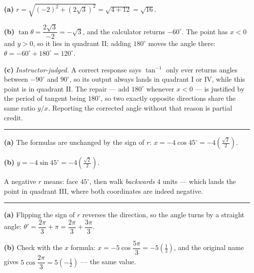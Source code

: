 \documentclass[12pt]{article}
\begin{document}

\textbf{(a)} $r = \sqrt{(-2)^2 + (2\sqrt{3})^2} = \sqrt{4 + 12} = \sqrt{16}$. 

\textbf{(b)} $\tan\theta = \dfrac{2\sqrt{3}}{-2} = -\sqrt{3}$, and the calculator returns $-60^\circ$. The point has $x < 0$ and $y > 0$, so it lies in quadrant II; adding $180^\circ$ moves the angle there:
$\theta = -60^\circ + 180^\circ = 120^\circ$. 

\textbf{(c)} \emph{Instructor-judged.} A correct response says $\tan^{-1}$ only ever returns angles between $-90^\circ$ and $90^\circ$, so its output always lands in quadrant I or IV, while this point is in quadrant II. The repair --- add $180^\circ$ whenever $x < 0$ --- is justified by the period of tangent being $180^\circ$, so two exactly opposite directions share the same ratio $y/x$. Reporting the corrected angle without that reason is partial credit.

\vspace{0.12cm}\noindent\rule{\linewidth}{0.2pt}\vspace{0.12cm}


\textbf{(a)} The formulas are unchanged by the sign of $r$:
$x = -4\cos 45^\circ = -4\left(\tfrac{\sqrt{2}}{2}\right)$. 

\textbf{(b)} $y = -4\sin 45^\circ = -4\left(\tfrac{\sqrt{2}}{2}\right)$. 

\smallskip
\noindent A negative $r$ means: face $45^\circ$, then walk \emph{backwards} $4$ units --- which lands the point in quadrant III, where both coordinates are indeed negative.

\vspace{0.12cm}\noindent\rule{\linewidth}{0.2pt}\vspace{0.12cm}


\textbf{(a)} Flipping the sign of $r$ reverses the direction, so the angle turns by a straight angle:
$\theta' = \dfrac{2\pi}{3} + \pi = \dfrac{2\pi}{3} + \dfrac{3\pi}{3}$. 

\textbf{(b)} Check with the $x$ formula: $x = -5\cos\dfrac{5\pi}{3} = -5\left(\tfrac{1}{2}\right)$, and the original name gives $5\cos\dfrac{2\pi}{3} = 5\left(-\tfrac{1}{2}\right)$ --- the same value. 
\end{document}
